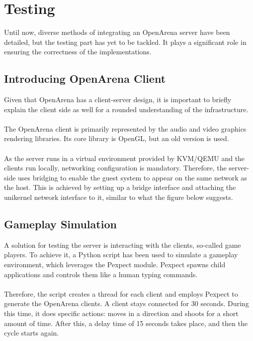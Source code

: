 \chapter{Testing}
Until now, diverse methods of integrating an OpenArena server have been detailed, but the testing part has yet to be tackled.
It plays a significant role in ensuring the correctness of the implementations.
\section{Introducing OpenArena Client}
Given that OpenArena has a client-server design, it is important to briefly explain the client side as well for a rounded understanding of the infrastructure. \\ \\
The OpenArena client is primarily represented by the audio and video graphics rendering libraries. Its core library is OpenGL\cite{opengl}, but
an old version is used. \\ \\
As the server runs in a virtual environment provided by KVM/QEMU and the clients run locally, networking configuration is mandatory. Therefore, the server-side
uses bridging to enable the guest system to appear on the same network as the host. This is achieved by setting up a bridge interface and attaching the unikernel
network interface to it, similar to what the figure\cite{kvm-virtual-bridge} below suggests.
\section{Gameplay Simulation}
A solution for testing the server is interacting with the clients, so-called game players.\@
To achieve it, a Python script has been used to simulate a gameplay environment, which leverages the Pexpect module.\@
Pexpect spawns child applications and controls them like a human typing commands. \\ \\
Therefore, the script creates a thread for each client and employs Pexpect to generate the OpenArena clients.
A client stays connected for 30 seconds. During this time, it does specific actions: moves in a direction and shoots for a short amount of time.
After this, a delay time of 15 seconds takes place, and then the cycle starts again.
